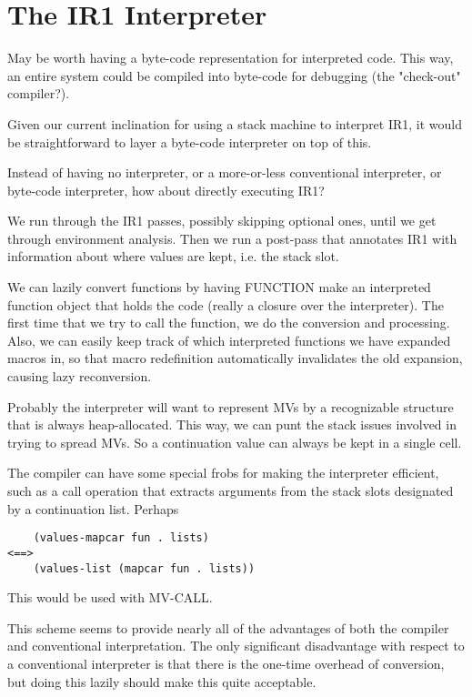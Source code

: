 
\chapter{The IR1 Interpreter}

May be worth having a byte-code representation for interpreted code.  This way,
an entire system could be compiled into byte-code for debugging (the
"check-out" compiler?).

Given our current inclination for using a stack machine to interpret IR1, it
would be straightforward to layer a byte-code interpreter on top of this.


Instead of having no interpreter, or a more-or-less conventional interpreter,
or byte-code interpreter, how about directly executing IR1?

We run through the IR1 passes, possibly skipping optional ones, until we get
through environment analysis.  Then we run a post-pass that annotates IR1 with
information about where values are kept, i.e. the stack slot.

We can lazily convert functions by having FUNCTION make an interpreted function
object that holds the code (really a closure over the interpreter).  The first
time that we try to call the function, we do the conversion and processing.
Also, we can easily keep track of which interpreted functions we have expanded
macros in, so that macro redefinition automatically invalidates the old
expansion, causing lazy reconversion.

Probably the interpreter will want to represent MVs by a recognizable structure
that is always heap-allocated.  This way, we can punt the stack issues involved
in trying to spread MVs.  So a continuation value can always be kept in a
single cell.

The compiler can have some special frobs for making the interpreter efficient,
such as a call operation that extracts arguments from the stack
slots designated by a continuation list.  Perhaps 

\begin{verbatim}
    (values-mapcar fun . lists)
<==>
    (values-list (mapcar fun . lists))
\end{verbatim}

This would be used with MV-CALL.


This scheme seems to provide nearly all of the advantages of both the compiler
and conventional interpretation.  The only significant disadvantage with
respect to a conventional interpreter is that there is the one-time overhead of
conversion, but doing this lazily should make this quite acceptable.

